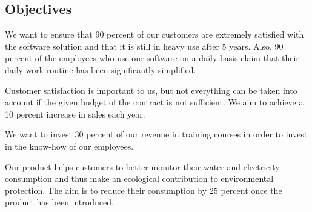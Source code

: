 \documentclass
[
 11pt, %
       DIV12,
       a4paper,
       oneside,
       parskip=half,
       headings=normal,
       bibliography=totoc,
       index=totoc,
       captions=tableheading,
       ]{article}
\begin{document}
\subsection{Objectives}
\label{sec:org3063db6}


We want to ensure that 90 percent of our customers are extremely satisfied with
the software solution and that it is still in heavy use after 5 years. Also, 90
percent of the employees who use our software on a daily basis claim that their
daily work routine has been significantly simplified.

Customer satisfaction is important to us, but not everything can be taken into
account if the given budget of the contract is not sufficient. We aim to achieve
a 10 percent increase in sales each year.

We want to invest 30 percent of our revenue in training courses in order to
invest in the know-how of our employees.

Our product helps customers to better monitor their water and electricity
consumption and thus make an ecological contribution to environmental
protection. The aim is to reduce their consumption by 25 percent once the
product has been introduced.
\end{document}
